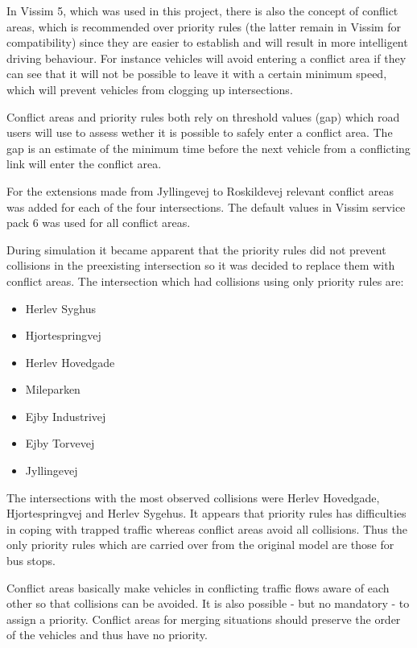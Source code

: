 In Vissim 5, which was used in this project, there is also the concept of conflict areas, which is recommended over priority rules (the latter remain in Vissim for compatibility) since they are easier to establish and will result in more intelligent driving behaviour. For instance vehicles will avoid entering a conflict area if they can see that it will not be possible to leave it with a certain minimum speed, which will prevent vehicles from clogging up intersections.

Conflict areas and priority rules both rely on threshold values (gap) which road users will use to assess wether it is possible to safely enter a conflict area. The gap is an estimate of the minimum time before the next vehicle from a conflicting link will enter the conflict area.

For the extensions made from Jyllingevej to Roskildevej relevant conflict areas was added for each of the four intersections. The default values in Vissim service pack 6 was used for all conflict areas.

During simulation it became apparent that the priority rules did not prevent collisions in the preexisting intersection so it was decided to replace them with conflict areas. The intersection which had collisions using only priority rules are:

\begin{itemize}
\item Herlev Syghus
\item Hjortespringvej
\item Herlev Hovedgade
\item Mileparken
\item Ejby Industrivej
\item Ejby Torvevej
\item Jyllingevej
\end{itemize}

The intersections with the most observed collisions were Herlev Hovedgade, Hjortespringvej and Herlev Sygehus. It appears that priority rules has difficulties in coping with trapped traffic whereas conflict areas avoid all collisions.
Thus the only priority rules which are carried over from the original model are those for bus stops. 

Conflict areas basically make vehicles in conflicting traffic flows aware of each other so that collisions can be avoided. It is also possible - but no mandatory - to assign a priority. Conflict areas for merging situations should preserve the order of the vehicles and thus have no priority. 

